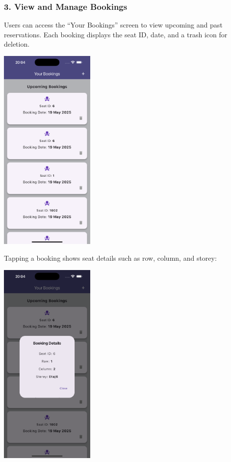 \documentclass[12pt,a4paper]{report} %
\begin{document}
\subsubsection*{3. View and Manage Bookings}

Users can access the “Your Bookings” screen to view upcoming and past reservations. Each booking displays the seat ID, date, and a trash icon for deletion.

\begin{center}
\includegraphics[width=0.35\textwidth]{images/Simulator Screenshot - iPhone 16 Pro Max - 2025-05-19 at 20.04.04.png}
\end{center}

Tapping a booking shows seat details such as row, column, and storey:

\begin{center}
\includegraphics[width=0.35\textwidth]{images/Simulator Screenshot - iPhone 16 Pro Max - 2025-05-19 at 20.04.14.png}
\end{center}
\end{document}
